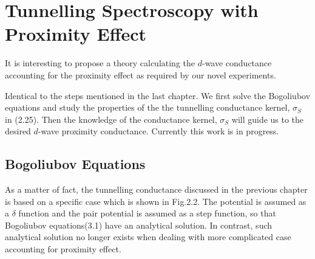 \chapter{Tunnelling Spectroscopy with Proximity Effect} %
\label{Chapter3}

It is interesting to propose a theory calculating the $d$-wave conductance accounting for the proximity effect as required by our novel experiments.

Identical to the steps mentioned in the last chapter. We first solve the Bogoliubov equations and study the properties of the the tunnelling conductance kernel, $\sigma_S$ in (2.25). Then the knowledge of the conductance kernel, $\sigma_S$ will guide us to the desired $d$-wave proximity conductance.
Currently this work is in progress.
\section{Bogoliubov Equations}
As a matter of fact, the tunnelling conductance discussed in the previous chapter is based on a specific case which is shown in Fig.2.2. The potential is assumed as a $\delta$ function and the pair potential is assumed as a step function, so that Bogoliubov  equations(3.1) have an analytical solution. In contrast, such analytical solution no longer exists when dealing with more complicated case accounting for proximity effect.
